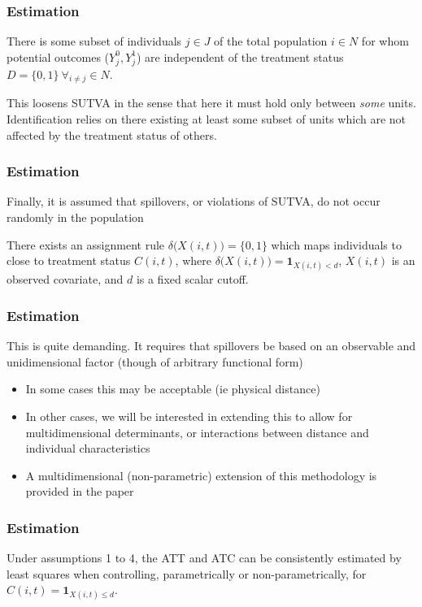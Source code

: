 \documentclass[10pt,letterpaper,subeqn]{beamer}
\begin{document}
\begin{frame}[label=estim6]
  \frametitle{Estimation}
\begin{tcolorbox}[title =3. SUTVA holds for some units]
There is some subset of individuals $j\in J$ of the total population $i\in N$ 
for whom potential outcomes ($Y_j^0, Y_j^1$) are independent of the treatment 
status $D=\{0,1\}\ \forall_{i\neq j} \in N$.
\end{tcolorbox}
\vspace{4mm}
This loosens SUTVA in the sense that here it must hold only between \emph{some}
units.  Identification relies on there existing at least some subset of units 
which are not affected by the treatment status of others.
\end{frame}


\begin{frame}[label=estim7]
  \frametitle{Estimation}
Finally, it is assumed that spillovers, or violations of SUTVA, do not occur 
randomly in the population
\vspace{4mm}
\begin{tcolorbox}[title =4. Assignment to close to treatment depends on observable $X$]
There exists an assignment rule $\delta\Big(X(i,t)\Big)=\{0,1\}$ which maps 
individuals to close to treatment status $C(i,t)$, where $\delta\Big(X(i,t)\Big)=
\mathbf{1}_{X(i,t)<d}$, $X(i,t)$ is an observed covariate, and $d$ is a fixed
scalar cutoff. 
\end{tcolorbox}
\end{frame}


\begin{frame}[label=estim8]
  \frametitle{Estimation}
This is quite demanding.  It requires that spillovers be based on an observable 
and unidimensional factor (though of arbitrary functional form)
\vspace{4mm}
\begin{itemize}
\item In some cases this may be acceptable (ie physical distance)
\item In other cases, we will be interested in extending this to allow for 
multidimensional determinants, or interactions between distance and individual
characteristics
\item A multidimensional (non-parametric) extension of this methodology is 
provided in the paper
\end{itemize}
\end{frame}

\begin{frame}[label=estim8]
  \frametitle{Estimation}
\begin{tcolorbox}[title =Proposition 1]
Under assumptions 1 to 4, the ATT and ATC can be 
consistently estimated by least squares when controlling, parametrically or
non-parametrically, for $C(i,t)=\mathbf{1}_{X(i,t)\leq d}$.
\end{tcolorbox}
\end{frame}
\end{document}
